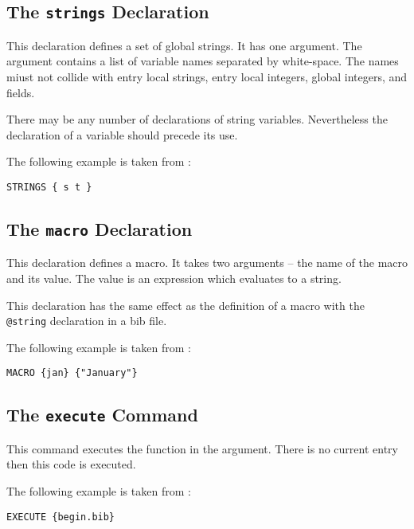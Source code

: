 \subsection{The \texttt{strings} Declaration}

This declaration defines a set of global strings. It has one argument.
The argument contains a list of variable names separated by
white-space. The names miust not collide with entry local strings,
entry local integers, global integers, and fields.

There may be any number of declarations of string variables.
Nevertheless the declaration of a variable should precede its use.

The following example is taken from :

\begin{lstlisting}[language=bst]
  STRINGS { s t }
\end{lstlisting}


\subsection{The \texttt{macro} Declaration}

This declaration defines a macro. It takes two arguments -- the name
of the macro and its value. The value is an expression which evaluates
to a string.

This declaration has the same effect as the definition of a macro with
the \texttt{@string} declaration in a bib file.

The following example is taken from :

\begin{lstlisting}[language=bst]
  MACRO {jan} {"January"}
\end{lstlisting}


\subsection{The \texttt{execute} Command}

This command executes the function in the argument. There is no
current entry then this code is executed.

The following example is taken from :

\begin{lstlisting}[language=bst]
  EXECUTE {begin.bib}
\end{lstlisting}


